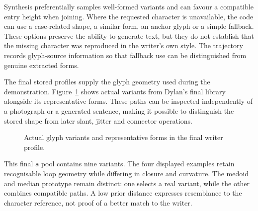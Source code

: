Synthesis preferentially samples well-formed variants and can favour a compatible entry height when joining. Where the requested character is unavailable, the code can use a case-related shape, a similar form, an anchor glyph or a simple fallback. These options preserve the ability to generate text, but they do not establish that the missing character was reproduced in the writer's own style. The trajectory records glyph-source information so that fallback use can be distinguished from genuine extracted forms.

The final stored profiles supply the glyph geometry used during the demonstration. Figure~\ref{fig:des-profile-example} shows actual variants from Dylan's final library alongside its representative forms. These paths can be inspected independently of a photograph or a generated sentence, making it possible to distinguish the stored shape from later slant, jitter and connector operations.
\begin{figure}[!htbp]\centering
{}
\caption{Actual glyph variants and representative forms in the final writer profile.}
\label{fig:des-profile-example}
\end{figure}
This final \texttt{a} pool contains nine variants. The four displayed examples retain recognisable loop geometry while differing in closure and curvature. The medoid and median prototype remain distinct: one selects a real variant, while the other combines compatible paths. A low prior distance expresses resemblance to the character reference, not proof of a better match to the writer.

